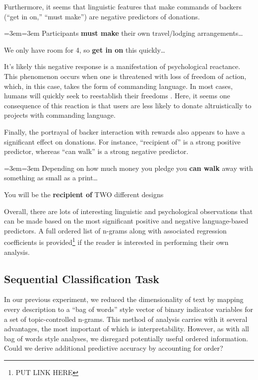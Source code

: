 \documentclass[letterpaper]{article}
\newenvironment{blockquote}{%
  \setlength{\parskip}{.5em}
  \par%
  \small
  \medskip
  \leftskip=3em\rightskip=3em%
  \noindent\ignorespaces}{%
  \par\medskip}
\begin{document}
Furthermore, it seems that linguistic features that make commands of backers (``get in on,'' ``must make'') are negative predictors of donations.
\begin{blockquote}
Participants \textbf{must make} their own travel/lodging arrangements\ldots\par\noindent
We only have room for 4, so \textbf{get in on} this quickly\ldots
\end{blockquote}
It's likely this negative response is a manifestation of psychological reactance. This phenomenon occurs when one is threatened with loss of freedom of action, which, in this case, takes the form of commanding language. In most cases, humans will quickly seek to reestablish their freedoms \cite{brehm1966theory}. Here, it seems one consequence of this reaction is that users are less likely to donate altruistically to projects with commanding language.

Finally, the portrayal of backer interaction with rewards also appears to have a significant effect on donations. For instance, ``recipient of'' is a strong positive predictor, whereas ``can walk'' is a strong negative predictor.
\begin{blockquote}
Depending on how much money you pledge you \textbf{can walk} away with something as small as a print\ldots\par\noindent
You will be the \textbf{recipient of} TWO different designs
\end{blockquote}
Overall, there are lots of interesting linguistic and psychological observations that can be made based on the most significant positive and negative language-based predictors. A full ordered list of n-grams along with associated regression coefficients is provided\footnote{PUT LINK HERE} if the reader is interested in performing their own analysis.

\subsection{Sequential Classification Task}
In our previous experiment, we reduced the dimensionality of text by mapping every description to a ``bag of words'' style vector of binary indicator variables for a set of topic-controlled n-grams. This method of analysis carries with it several advantages, the most important of which is interpretability. However, as with all bag of words style analyses, we disregard potentially useful ordered information. Could we derive additional predictive accuracy by accounting for order?
\end{document}
